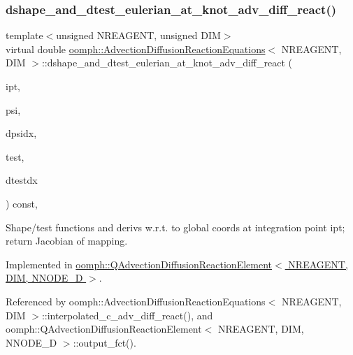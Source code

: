 \subsubsection{\texorpdfstring{dshape\+\_\+and\+\_\+dtest\+\_\+eulerian\+\_\+at\+\_\+knot\+\_\+adv\+\_\+diff\+\_\+react()}{dshape\_and\_dtest\_eulerian\_at\_knot\_adv\_diff\_react()}}
{\footnotesize\ttfamily template$<$unsigned N\+R\+E\+A\+G\+E\+NT, unsigned D\+IM$>$ \\
virtual double \hyperlink{classoomph_1_1AdvectionDiffusionReactionEquations}{oomph\+::\+Advection\+Diffusion\+Reaction\+Equations}$<$ N\+R\+E\+A\+G\+E\+NT, D\+IM $>$\+::dshape\+\_\+and\+\_\+dtest\+\_\+eulerian\+\_\+at\+\_\+knot\+\_\+adv\+\_\+diff\+\_\+react (\begin{DoxyParamCaption}\item[{const unsigned \&}]{ipt,  }\item[{\hyperlink{classoomph_1_1Shape}{Shape} \&}]{psi,  }\item[{\hyperlink{classoomph_1_1DShape}{D\+Shape} \&}]{dpsidx,  }\item[{\hyperlink{classoomph_1_1Shape}{Shape} \&}]{test,  }\item[{\hyperlink{classoomph_1_1DShape}{D\+Shape} \&}]{dtestdx }\end{DoxyParamCaption}) const\hspace{0.3cm}{\ttfamily [protected]}, {}}



Shape/test functions and derivs w.\+r.\+t. to global coords at integration point ipt; return Jacobian of mapping. 



Implemented in \hyperlink{classoomph_1_1QAdvectionDiffusionReactionElement_a2a52a7accae36bd8e3bb46e659f9c983}{oomph\+::\+Q\+Advection\+Diffusion\+Reaction\+Element$<$ N\+R\+E\+A\+G\+E\+N\+T, D\+I\+M, N\+N\+O\+D\+E\+\_\+D $>$}.



Referenced by oomph\+::\+Advection\+Diffusion\+Reaction\+Equations$<$ N\+R\+E\+A\+G\+E\+N\+T, D\+I\+M $>$\+::interpolated\+\_\+c\+\_\+adv\+\_\+diff\+\_\+react(), and oomph\+::\+Q\+Advection\+Diffusion\+Reaction\+Element$<$ N\+R\+E\+A\+G\+E\+N\+T, D\+I\+M, N\+N\+O\+D\+E\+\_\+D $>$\+::output\+\_\+fct().

\mbox{\label{classoomph_1_1AdvectionDiffusionReactionEquations_a8c90c9aa40fbe311742b18a2c979730a}} 
